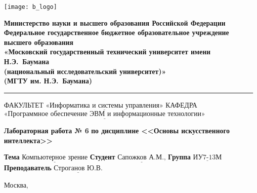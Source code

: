 \thispagestyle{empty}

\noindent \begin{minipage}{0.15\textwidth}
	\texttt{[image: b\_logo]}
\end{minipage}
\noindent\begin{minipage}{0.85\textwidth}\centering
	\textbf{Министерство науки и высшего образования Российской Федерации}\\
	\textbf{Федеральное государственное бюджетное образовательное учреждение высшего образования}\\
	\textbf{«Московский государственный технический университет имени Н.Э.~Баумана}\\
	\textbf{(национальный исследовательский университет)»}\\
	\textbf{(МГТУ им. Н.Э.~Баумана)}
\end{minipage}

\noindent\rule{\linewidth}{3pt}
\newline\newline
\noindent ФАКУЛЬТЕТ $\underline{\text{«Информатика и системы управления»}}$ \newline\newline
\noindent КАФЕДРА $\underline{\text{«Программное обеспечение ЭВМ и информационные технологии»}}$

\vspace{1cm}

\begin{center}
	\noindent\begin{minipage}{1.3\textwidth}\centering
		\Large\textbf{  Лабораторная работа № 6}\newline
		\textbf{по дисциплине <<Основы искусственного}\newline
		\textbf{интеллекта>>}\newline
	\end{minipage}
\end{center}

\noindent\textbf{Тема} $\underline{\text{Компьютерное зрение}}$\newline\newline
\noindent\textbf{Студент} $\underline{\text{Сапожков А.М.,}}$\newline\newline
\noindent\textbf{Группа} $\underline{\text{ИУ7-13М}}$\newline\newline
\noindent\textbf{Преподаватель} $\underline{\text{Строганов Ю.В.}}$\newline

\begin{center}
	\vfill
	Москва,~\the\year
\end{center}
\clearpage
